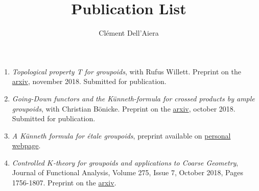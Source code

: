\documentclass[a4paper]{article}
\title{Publication List}
\date{}
\author{ Clément Dell'Aiera}
\begin{document}
\maketitle

\begin{enumerate}
\item \textit{Topological property T for groupoids}, with Rufus Willett. Preprint on the \href{https://arxiv.org/abs/1811.07085}{arxiv}, november 2018. Submitted for publication.\\

\item \textit{Going-Down functors and the Künneth-formula for crossed products by ample groupoids}, with Christian Bönicke. Preprint on the \href{https://arxiv.org/abs/1810.04415}{arxiv}, october 2018. Submitted for publication.\\

\item \textit{A K\"{u}nneth formula for \'etale groupoids}, preprint available on \href{http://math.hawaii.edu/~dellaiera/Research.html}{personal webpage}.\\

\item \textit{Controlled $K$-theory for groupoids and applications to Coarse Geometry}, Journal of Functional Analysis, Volume 275, Issue 7, October 2018, Pages 1756-1807. Preprint on the \href{https://arxiv.org/abs/1710.06099}{arxiv}. 
\end{enumerate}

\newpage

 
\end{document}
